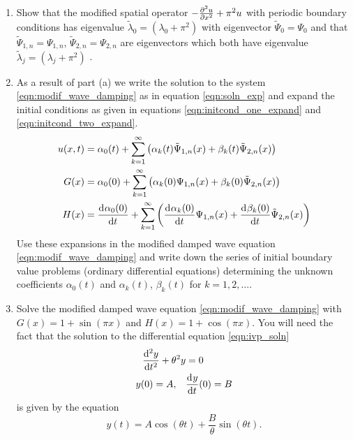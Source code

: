 \begin{enumerate}
\item Show that the modified spatial operator $-\frac{\partial^{2} u}{\partial x^{2}} + \pi^2 u$ with periodic boundary conditions has eigenvalue $\tilde{\lambda}_0 = \left(\lambda_{0} + \pi^2\right)$ with eigenvector $\tilde{\Psi}_0 = \Psi_0$ and that $\tilde{\Psi}_{1,n} = \Psi_{1,n}$, $\tilde{\Psi}_{2,n} = \Psi_{2,n}$ are eigenvectors which both have eigenvalue $\tilde{\lambda}_{j} = \left( \lambda_{j} + \pi^2  \right)$ .  

\item As a result of part (a) we write the solution to  the system \eqref{eqn:modif_wave_damping} as in equation \eqref{eqn:soln_exp} and expand the initial conditions as given in equations \eqref{eqn:initcond_one_expand} and \eqref{eqn:initcond_two_expand}.
\begin{align}
	u(x,t) &= \alpha_0(t) + \sum_{k=1}^{\infty} \left( \alpha_{k}(t)\tilde{\Psi}_{1,n}(x) + \beta_{k}(t)\tilde{\Psi}_{2,n}(x) \right)\label{eqn:soln_exp} \\
	G(x) & = \alpha_0(0) + \sum_{k=1}^{\infty} \left( \alpha_{k}(0){\Psi}_{1,n}(x) + \beta_{k}(0)\tilde{\Psi}_{2,n}(x) \right) \label{eqn:initcond_one_expand}\\
	H(x) & = \frac{{\rm d}^{} \alpha_0(0)}{{\rm d} t^{}} +  \sum_{k=1}^{\infty} \left( \frac{{\rm d}^{} \alpha_{k}(0)}{{\rm d} t^{}}{\Psi}_{1,n}(x) + \frac{{\rm d}^{} \beta_{k}(0)}{{\rm d} t^{}}\tilde{\Psi}_{2,n}(x) \right)\label{eqn:initcond_two_expand}
\end{align}
Use these expansions in the modified damped wave equation \eqref{eqn:modif_wave_damping} and write down the series of initial boundary value problems (ordinary differential equations) determining the unknown coefficients $\alpha_0(t)$ and $\alpha_{k}(t)$, $\beta_{k}(t)$ for $k = 1,2,\ldots$. 

\item Solve the modified damped wave equation \eqref{eqn:modif_wave_damping} with  $G(x) = 1 + \sin(\pi x)$ and $H(x) = 1 + \cos(\pi x)$.  You will need the fact that the solution to the differential equation \eqref{eqn:ivp_soln} 
\begin{align}
\frac{{\rm d}^{2} y}{{\rm d} t^{2}} + \theta^{2}y & = 0 \label{eqn:ivp_soln}\\
y(0)  = A, \quad &\frac{{\rm d}^{} y}{{\rm d} t^{}}(0)  = B \nonumber
\end{align}
is given by the equation 
\[
y(t) = A \cos(\theta t) + \frac{B}{\theta} \sin(\theta t).
\]



\end{enumerate}



